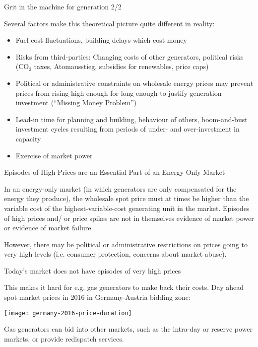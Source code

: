 \documentclass[10pt,aspectratio=169,dvipsnames]{beamer}
\def\co2{CO${}_2$}
\let\olditem\item
\renewcommand{\item}{%
\olditem\vspace{5pt}}
\begin{document}
\begin{frame}{Grit in the machine for generation 2/2}

  Several factors make this theoretical picture quite different in reality:
  \begin{itemize}
    \item Fuel cost fluctuations, building delays which cost money
  \item Risks from third-parties:  Changing costs of other generators, political risks (\co2 taxes,  Atomausstieg, subsidies for renewables, price caps)
  \item Political or administrative constraints on wholesale energy
    prices may prevent prices from rising high enough for long enough
    to justify generation investment (``Missing Money Problem'')
  \item  Lead-in time for planning and building, behaviour of others, boom-and-bust investment cycles resulting from periods of under- and over-investment in capacity
    \item Exercise of \alert{market power}
  \end{itemize}

\end{frame}


\begin{frame}{Episodes of High Prices are an Essential Part of an Energy-Only Market}

  In an energy-only market (in which generators are only compensated
  for the energy they produce), the wholesale spot price must at times
  be higher than the variable cost of the highest-variable-cost
  generating unit in the market. Episodes of high prices and/ or price
  spikes are not in themselves evidence of market power or evidence of
  market failure.

  However, there may be political or administrative restrictions on
  prices going to very high levels (i.e. consumer protection, concerns about market abuse).




\end{frame}


\begin{frame}{Today's market does not have episodes of very high prices}

  This makes it hard for e.g. gas generators to make back their
  costs. Day ahead spot market prices in 2016 in Germany-Austria bidding zone:

  \centering
  \texttt{[image: germany-2016-price-duration]}

  \raggedright
  Gas generators can bid into other markets, such as the intra-day or
  reserve power markets, or provide redispatch services.



\end{frame}
\end{document}
